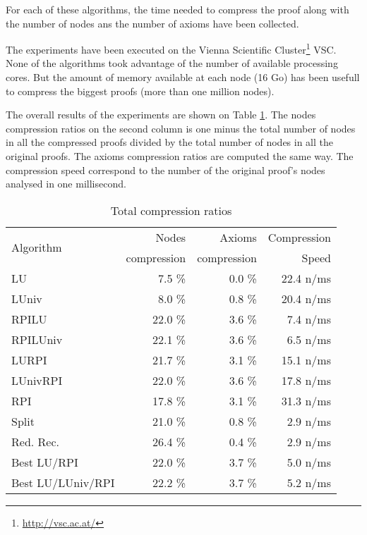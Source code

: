 \documentclass{llncs}
\begin{document}
For each of these algorithms, the time needed to compress the proof along with the number of nodes
ans the number of axioms have been collected. 

The experiments have been executed on the Vienna Scientific
Cluster\footnote{\url{http://vsc.ac.at/}} VSC. None of the algorithms took advantage of the number
of available processing cores. But the amount of memory available at each node (16 Go) has been
usefull to compress the biggest proofs (more than one million nodes).

The overall results of the experiments are shown on Table \ref{tab:average}. The nodes compression
ratios on the second column is one minus the total number of nodes in all the compressed proofs divided
by the total number of nodes in all the original proofs. The axioms compression ratios are computed
the same way. The compression speed correspond to the number of the original proof's nodes analysed
in one millisecond.

\begin{table}[tb]
  \caption{Total compression ratios}
  \label{tab:average}
  \centering
  \begin{tabular}{lrrr}
    \toprule
    \multirow{2}{*}{Algorithm} & Nodes       & Axioms      & Compression \\
                               & compression & compression &       Speed \\
    \midrule
    LU                &  7.5 \% &  0.0 \% & 22.4 n/ms \\
    LUniv             &  8.0 \% &  0.8 \% & 20.4 n/ms \\
    RPILU             & 22.0 \% &  3.6 \% &  7.4 n/ms \\
    RPILUniv          & 22.1 \% &  3.6 \% &  6.5 n/ms \\
    LURPI             & 21.7 \% &  3.1 \% & 15.1 n/ms \\
    LUnivRPI          & 22.0 \% &  3.6 \% & 17.8 n/ms \\
    RPI               & 17.8 \% &  3.1 \% & 31.3 n/ms \\
    Split             & 21.0 \% &  0.8 \% &  2.9 n/ms \\
    Red. Rec.         & 26.4 \% &  0.4 \% &  2.9 n/ms \\
    Best LU/RPI       & 22.0 \% &  3.7 \% &  5.0 n/ms \\
    Best LU/LUniv/RPI & 22.2 \% &  3.7 \% &  5.2 n/ms \\
    \bottomrule
  \end{tabular}
\end{table}
\end{document}
